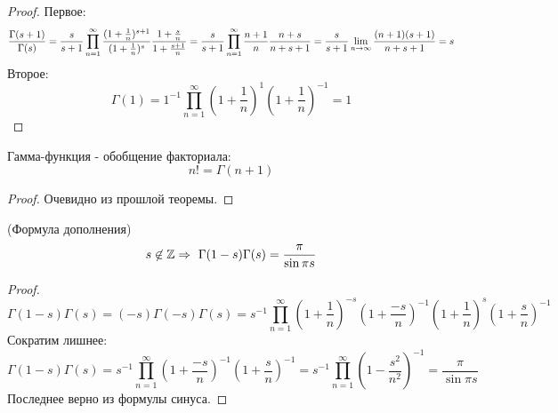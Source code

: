 \begin{proof}
	Первое:
	\[
	\frac{\Gamma(s+1)}{\Gamma(s)} = \frac{s}{s+1}\prod_{n=1}^\infty\frac{(1+\frac{1}{n})^{s+1}}{(1+\frac{1}{n})^{s}}\frac{1+\frac{s}{n}}{1+\frac{s+1}{n}} = \frac{s}{s+1}\prod\limits_{n=1}^\infty \frac{n+1}{n} \frac{n+s}{n+s+1} = \frac{s}{s+1}\lim\limits_{n\to\infty}\frac{(n+1)(s+1)}{n+s+1} = s
	\]
	Второе:
	\[
	\Gamma(1)=1^{-1}\prod\limits_{n=1}^\infty(1+\frac{1}{n})^1(1+\frac{1}{n})^{-1} = 1
	\]
\end{proof}

\begin{corollary}
	Гамма-функция - обобщение факториала:
	\[
	n! = \Gamma(n + 1)
	\]
\end{corollary}

\begin{proof}
	Очевидно из прошлой теоремы.
\end{proof}

\begin{theorem}
	(Формула дополнения)
	\[
	s\not\in\mathbb{Z} \Rightarrow\ \Gamma(1-s)\Gamma(s) = \frac{\pi}{\sin{\pi s}}
	\]
\end{theorem}

\begin{proof}
	\[
	\Gamma(1-s)\Gamma(s) = (-s)\Gamma(-s)\Gamma(s)=s^{-1}\prod\limits_{n=1}^\infty(1+\frac{1}{n})^{-s}(1+\frac{-s}{n})^{-1}(1+\frac{1}{n})^s(1+\frac{s}{n})^{-1}
	\]
	Сократим лишнее:
	\[
	\Gamma(1-s)\Gamma(s)=s^{-1}\prod\limits_{n=1}^\infty(1+\frac{-s}{n})^{-1}(1+\frac{s}{n})^{-1} = s^{-1}\prod\limits_{n=1}^\infty(1-\frac{s^2}{n^2})^{-1} =  \frac{\pi}{\sin{\pi s}}
	\]
	Последнее верно из формулы синуса.
\end{proof}